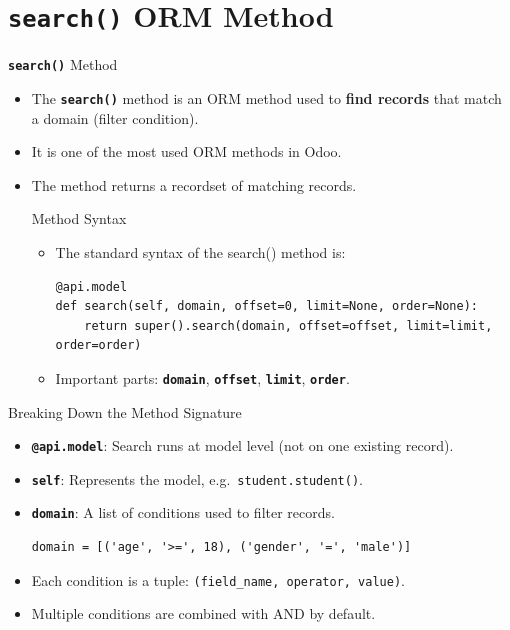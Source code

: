 
\section{\textbf{\texttt{search()}} ORM Method}

\begin{frame}[fragile]{\textbf{\texttt{search()}} Method}
	\begin{itemize}
		\item The \textbf{\texttt{search()}} method is an ORM method used to \textbf{find records} that match a domain (filter condition).
		\item It is one of the most used ORM methods in Odoo.
		\item The method returns a recordset of matching records.
\begin{block}{Method Syntax}
	\begin{itemize}
		\item The standard syntax of the search() method is:
\begin{lstlisting}
@api.model
def search(self, domain, offset=0, limit=None, order=None):
	return super().search(domain, offset=offset, limit=limit, order=order)
\end{lstlisting}
		\item Important parts: \textbf{\texttt{domain}}, \textbf{\texttt{offset}}, \textbf{\texttt{limit}}, \textbf{\texttt{order}}.
	\end{itemize}
\end{block}
	\end{itemize}
\end{frame}

\begin{frame}[fragile]{Breaking Down the Method Signature}
	\begin{block}{}
		\begin{itemize}
			\item \textbf{\texttt{@api.model}}: Search runs at model level (not on one existing record).
			\item \textbf{\texttt{self}}: Represents the model, e.g.\ \texttt{student.student()}.
			\item \textbf{\texttt{domain}}: A list of conditions used to filter records.
\begin{lstlisting}
domain = [('age', '>=', 18), ('gender', '=', 'male')]
\end{lstlisting}
			\item Each condition is a tuple: \texttt{(field\_name, operator, value)}.
			\item Multiple conditions are combined with AND by default.
		\end{itemize}
	\end{block}
\end{frame}

